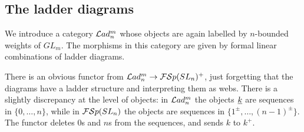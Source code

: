 \documentclass[10pt,leqno]{article}
\begin{document}
\subsection{The ladder diagrams}

We introduce a category $ \mathcal{L}ad_n^m $ whose objects are again labelled by $n$-bounded weights of $ GL_m$.  The morphisms in this category are given by formal linear combinations of ladder diagrams.


There is an obvious functor from $\mathcal{L}ad_n^m \to {\mathcal{FS}p}(SL_n)^+$, just forgetting that the diagrams have a ladder structure and interpreting them as webs. There is a slightly discrepancy at the level of objects: in $\mathcal{L}ad_n^m$ the objects ${\underline{k}}$ are sequences in $\{0,\ldots,n\}$, while in ${\mathcal{FS}p}(SL_n)$ the objects are sequences in $\{1^\pm,\ldots,(n-1)^\pm\}$. The functor deletes $0$s and $n$s from the sequences, and sends $k$ to $k^+$.
\end{document}
